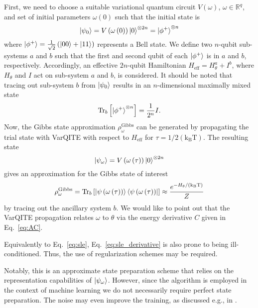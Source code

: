 \documentclass[twocolumn, aps, pra, superscriptaddress, floatfix]{revtex4}
\begin{document}
First, we need to choose a suitable variational quantum circuit $V\left(\omega\right)$, $\omega \in \mathbb{R}^{q}$, and set of initial parameters $\omega(0)$ such that the initial state is
\begin{equation*}
     \ket{ \psi_{0}} = V\left(\omega\left(0\right)\right)\ket{0}^{\otimes 2n} = \ket{\phi^{+}}^{\otimes n}
\end{equation*}
where $\ket{\phi^{+}} = \frac{1}{\sqrt{2}}\left(\ket{00}+\ket{11}\right)$ represents a Bell state.
We define two $n$-qubit sub-systems $a$ and $b$ such that the first and second qubit of each $\ket{\phi^{+}}$ is in $a$ and $b$, respectively. Accordingly, an effective $2n$-qubit Hamiltonian $H_{\text{eff}} = H_{\theta}^a + I^b$, where $H_{\theta}$ and $I$ act on sub-system $a$ and $b$, is considered.
It should be noted that tracing out sub-system $b$ from $\ket{ \psi_{0}}$ results in an $n$-dimensional maximally mixed state
\begin{equation*}
		  \text{Tr}_{b}\left[\ket{\phi^{+}}^{\otimes n} \right] = \frac{1}{2^n}I.
\end{equation*}
Now, the Gibbs state approximation $\rho_{\omega}^{\text{Gibbs}}$ can be generated by propagating the trial state with VarQITE with respect to $H_{\text{eff}}$ for $\tau = 1/2\left(\text{k}_{\text{B}}\text{T}\right)$.
The resulting state
\begin{equation*}
	\ket{ \psi_{\omega}} = V\left(\omega\left(\tau\right)\right)\ket{0}^{\otimes 2n}
\end{equation*}
gives an approximation for the Gibbs state of interest
\begin{equation*}	
	\rho_{\omega}^{\text{Gibbs}} = \text{Tr}_{b}\left[\ket{ \psi\left({\omega\left(\tau\right)}\right)}\bra{ \psi\left({\omega\left(\tau\right)}\right)} \right] \approx  \frac{e^{-H_{\theta}/\left(\text{k}_{\text{B}}\text{T}\right)}}{Z}
\end{equation*}
by tracing out the ancillary system $b$.
We would like to point out that the VarQITE propagation relates $\omega$ to $\theta$ via the energy derivative $C$ given in Eq.~\eqref{eq:AC}.

Equivalently to Eq.~\eqref{eq:sle}, Eq.~\eqref{eq:sle_derivative} is also prone to being ill-conditioned. Thus, the use of regularization schemes may be required.

Notably, this is an approximate state preparation scheme that relies on the representation capabilities of $\ket{ \psi_{\omega}}$. However, since the algorithm is employed in the context of machine learning we do not necessarily require perfect state preparation. The noise may even improve the training, as discussed e.g., in \cite{Noh2017RegularizingDN}.
\end{document}
